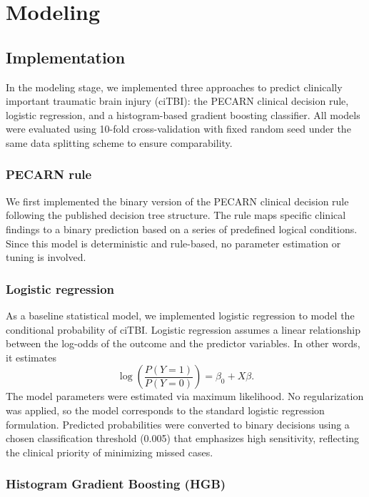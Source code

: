 \documentclass[11pt,letterpaper]{article}
\begin{document}
\section{Modeling}

\subsection{Implementation}

In the modeling stage, we implemented three approaches to predict clinically important traumatic brain injury (ciTBI): the PECARN clinical decision rule, logistic regression, and a histogram-based gradient boosting classifier. All models were evaluated using 10-fold cross-validation with fixed random seed under the same data splitting scheme to ensure comparability.

\subsubsection{PECARN rule}

We first implemented the binary version of the PECARN clinical decision rule following the published decision tree structure. The rule maps specific clinical findings to a binary prediction based on a series of predefined logical conditions. Since this model is deterministic and rule-based, no parameter estimation or tuning is involved.

\subsubsection{Logistic regression}

As a baseline statistical model, we implemented logistic regression to model the conditional probability of ciTBI. Logistic regression assumes a linear relationship between the log-odds of the outcome and the predictor variables. In other words, it estimates
$$
\log\left(\frac{P(Y=1)}{P(Y=0)}\right) = \beta_0 + X\beta.
$$
The model parameters were estimated via maximum likelihood. No regularization was applied, so the model corresponds to the standard logistic regression formulation. Predicted probabilities were converted to binary decisions using a chosen classification threshold (0.005) that emphasizes high sensitivity, reflecting the clinical priority of minimizing missed cases.

\subsubsection{Histogram Gradient Boosting (HGB)}
\end{document}
